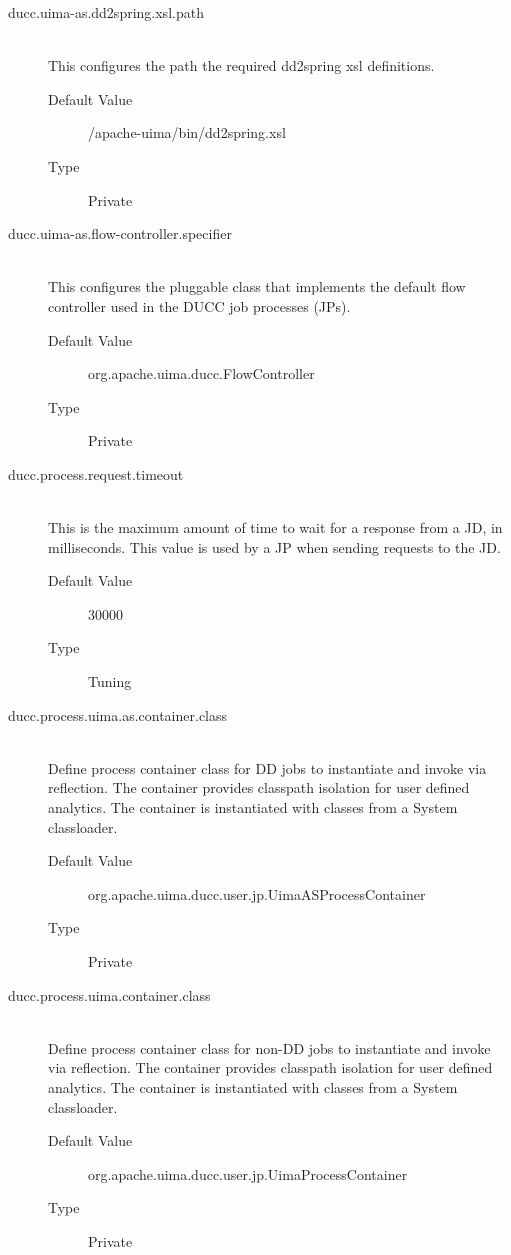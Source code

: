 \begin{description}
      \item[ducc.uima-as.dd2spring.xsl.path] \hfill \\
        This configures the path the required dd2spring xsl definitions. 
        \begin{description}
          \item[Default Value] \ducchome/apache-uima/bin/dd2spring.xsl
          \item[Type] Private 
        \end{description}
        
      \item[ducc.uima-as.flow-controller.specifier] \hfill \\
        This configures the pluggable class that implements the default flow controller used in the 
        DUCC job processes (JPs). 
        \begin{description}
          \item[Default Value] org.apache.uima.ducc.FlowController
          \item[Type] Private 
        \end{description}

      \item[ducc.process.request.timeout] \hfill \\
        This is the maximum amount of time to wait for a response from a JD, in milliseconds. This value
        is used by a JP when sending requests to the JD. 
        \begin{description}
          \item[Default Value] 30000
          \item[Type] Tuning
        \end{description}

      \item[ducc.process.uima.as.container.class] \hfill \\
        Define process container class for DD jobs to instantiate and invoke via reflection. 
        The container provides classpath  isolation for user defined analytics.
        The container is instantiated with classes from a System classloader.
        \begin{description}
          \item[Default Value] org.apache.uima.ducc.user.jp.UimaASProcessContainer
          \item[Type] Private
        \end{description}

      \item[ducc.process.uima.container.class] \hfill \\
        Define process container class for non-DD jobs to instantiate and invoke via reflection. 
        The container provides classpath  isolation for user defined analytics.        
        The container is instantiated with classes from a System classloader.
        \begin{description}
          \item[Default Value] org.apache.uima.ducc.user.jp.UimaProcessContainer
          \item[Type] Private
        \end{description}


\end{description}
